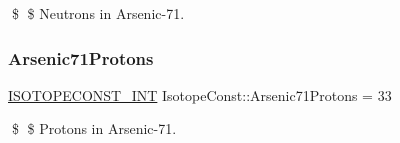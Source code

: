 \$ \$ Neutrons in Arsenic-\/71. \mbox{\label{group___isotope_const-_arsenic-_as71_ga9ac7826ac43a562ae7e4433c4ea323f3}} 
\subsubsection{\texorpdfstring{Arsenic71\+Protons}{Arsenic71Protons}}
{\footnotesize\ttfamily \mbox{\hyperlink{group___isotope_const-_macros_ga5f18360b3e99483a35c32d789e62621c}{I\+S\+O\+T\+O\+P\+E\+C\+O\+N\+S\+T\+\_\+\+I\+NT}} Isotope\+Const\+::\+Arsenic71\+Protons = 33}

\$ \$ Protons in Arsenic-\/71. 